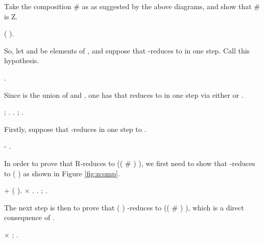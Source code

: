      Take the composition  \#  as  as suggested by the above diagrams, and show that  \#  is Z. \begin{coqdoccode}
\coqdocemptyline
\coqdocindent{1.00em}
\coqdoctac{\ensuremath{\exists}} (  ).\coqdoceol
\coqdocemptyline
\end{coqdoccode}
So, let  and  be elements of , and suppose that  -reduces to  in one step. Call  this hypothesis.  \begin{coqdoccode}
\coqdocemptyline
\coqdocindent{1.00em}
   .\coqdoceol
\coqdocemptyline
\end{coqdoccode}
Since  is the union of  and , one has that  reduces to  in one step via either  or .  \begin{coqdoccode}
\coqdocemptyline
\coqdocindent{1.00em}
 ; .  .  ; .\coqdoceol
\coqdocemptyline
\end{coqdoccode}
Firstly, suppose that  -reduces in one step to .  \begin{coqdoccode}
\coqdocemptyline
\coqdocindent{1.00em}
- .\coqdoceol
\coqdocemptyline
\end{coqdoccode}
In order to prove that  R-reduces to (( \# ) ), we first need to show that  -reduces to ( ) as shown in Figure \ref{fig:zcomp}. \begin{coqdoccode}
\coqdocemptyline
\coqdocindent{2.00em}
+    ( ). \ensuremath{\times}    .  .  ; .\coqdoceol
\coqdocemptyline
\end{coqdoccode}
The next step is then to prove that ( ) -reduces to (( \# ) ), which is a direct consequence of . \begin{coqdoccode}
\coqdocemptyline
\coqdocindent{3.00em}
\ensuremath{\times}    ; .\coqdoceol
\coqdocemptyline
\end{coqdoccode}

